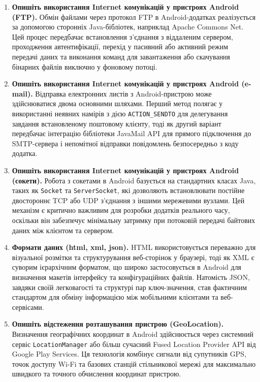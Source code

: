 \documentclass[14pt, a4paper]{extreport}
\begin{document}
\begin{enumerate}
		\item \textbf{Опишіть використання Internet комунікацій у пристроях Android (FTP).} Обмін файлами через протокол FTP в Android-додатках реалізується за допомогою сторонніх Java-бібліотек, наприклад Apache Commons Net. Цей процес передбачає встановлення з'єднання з віддаленим сервером, проходження автентифікації, перехід у пасивний або активний режим передачі даних та виконання команд для завантаження або скачування бінарних файлів виключно у фоновому потоці.
		
		\item \textbf{Опишіть використання Internet комунікацій у пристроях Android (e-mail).} Відправка електронних листів з Android-пристрою може здійснюватися двома основними шляхами. Перший метод полягає у використанні неявних намірів з дією \texttt{ACTION\_SENDTO} для делегування завдання встановленому поштовому клієнту, тоді як другий варіант передбачає інтеграцію бібліотеки JavaMail API для прямого підключення до SMTP-сервера і непомітної відправки повідомлень безпосередньо з коду додатка.
		
		\item \textbf{Опишіть використання Internet комунікацій у пристроях Android (сокети).} Робота з сокетами в Android базується на стандартних класах Java, таких як \texttt{Socket} та \texttt{ServerSocket}, які дозволяють встановлювати постійне двостороннє TCP або UDP з'єднання з іншими мережевими вузлами. Цей механізм є критично важливим для розробки додатків реального часу, оскільки він забезпечує мінімальну затримку при потоковій передачі байтових даних між клієнтом та сервером.
		
		\item \textbf{Формати даних (html, xml, json).} HTML використовується переважно для візуальної розмітки та структурування веб-сторінок у браузері, тоді як XML є суворим ієрархічним форматом, що широко застосовується в Android для визначення макетів інтерфейсу та конфігураційних файлів. Натомість JSON, завдяки своїй легковагості та структурі пар ключ-значення, став фактичним стандартом для обміну інформацією між мобільними клієнтами та веб-сервісами.
		
		\item \textbf{Опишіть відстеження розташування пристрою (GeoLocation).} Визначення географічних координат в Android здійснюється через системний сервіс \texttt{LocationManager} або більш сучасний Fused Location Provider API від Google Play Services. Ця технологія комбінує сигнали від супутників GPS, точок доступу Wi-Fi та базових станцій стільникової мережі для максимально швидкого та точного обчислення координат пристрою.
	\end{enumerate}
\end{document}
